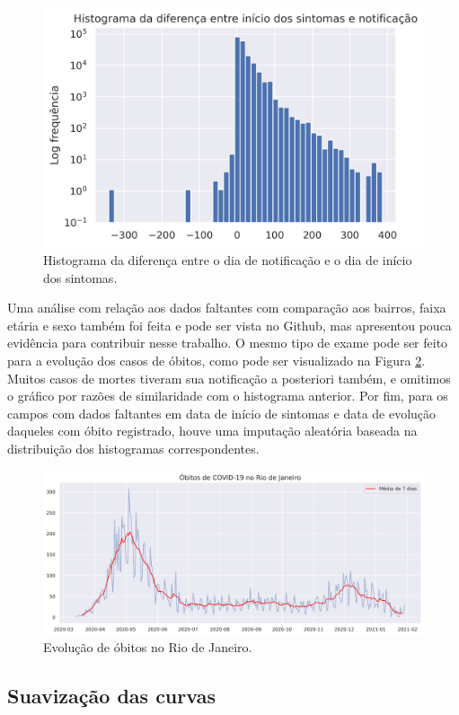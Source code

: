 \begin{figure}[!ht]
    \centering
    \includegraphics[width = .7\textwidth]{../images/histogram-comparion.png}
    \caption{Histograma da diferença entre o dia de notificação e o dia de início dos sintomas.}
    \label{histogram-diff}
\end{figure}

Uma análise com relação aos dados faltantes com comparação aos bairros, faixa etária e sexo também foi feita e pode ser vista no Github, mas apresentou pouca evidência para contribuir nesse trabalho. 
O mesmo tipo de exame pode ser feito para a evolução dos casos de óbitos, como pode ser visualizado na Figura \ref{deaths}. 
Muitos casos de mortes tiveram sua notificação a posteriori também, e omitimos o gráfico por razões de similaridade com o histograma anterior.
Por fim, para os campos com dados faltantes em data de início de sintomas e data de evolução daqueles com óbito registrado, houve uma imputação aleatória baseada na distribuição dos histogramas correspondentes. 

\begin{figure}[!ht]
    \centering
    \includegraphics[width = \textwidth]{../images/deaths-rio.png}
    \caption{Evolução de óbitos no Rio de Janeiro.}
    \label{deaths}
\end{figure}

\subsection{Suavização das curvas}
\label{moving-average}

